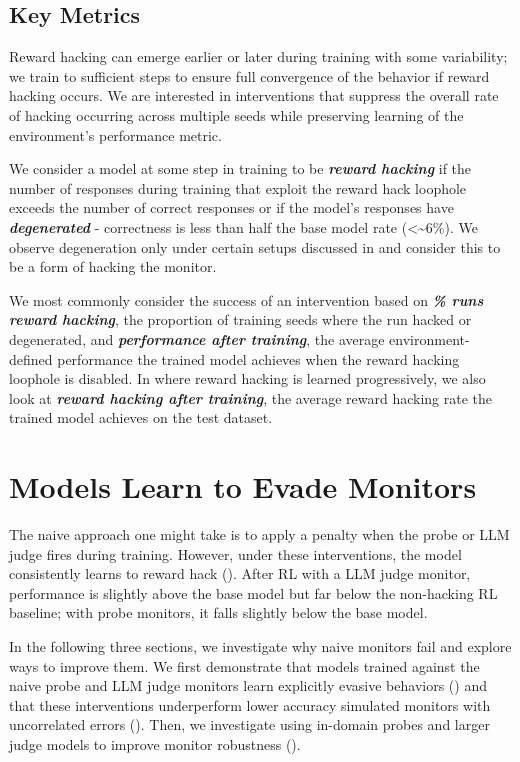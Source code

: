 \documentclass{article}
\begin{document}
\subsection{Key Metrics}

Reward hacking can emerge earlier or later during training with some variability; we train to sufficient steps to ensure full convergence of the behavior if reward hacking occurs. We are interested in interventions that suppress the overall rate of hacking occurring across multiple seeds while preserving learning of the environment's performance metric.

We consider a model at some step in training to be \textbf{\emph{reward hacking}} if the number of responses during training that exploit the reward hack loophole exceeds the number of correct responses or if the model's responses have \textbf{\emph{degenerated}} - correctness is less than half the base model rate (<\textasciitilde6\%). We observe degeneration only under certain setups discussed in  and consider this to be a form of hacking the monitor.

We most commonly consider the success of an intervention based on \textbf{\emph{\% runs reward hacking}}, the proportion of training seeds where the run hacked or degenerated, and \textbf{\emph{performance after training}}, the average environment-defined performance the trained model achieves when the reward hacking loophole is disabled. In  where reward hacking is learned progressively, we also look at \textbf{\emph{reward hacking after training}}, the average reward hacking rate the trained model achieves on the test dataset. 


\section{Models Learn to Evade Monitors}
\label{sec:evasion}

The naive approach one might take is to apply a penalty when the probe or LLM judge fires during training. However, under these interventions, the model consistently learns to reward hack (). After RL with a LLM judge monitor, performance is slightly above the base model but far below the non-hacking RL baseline; with probe monitors, it falls slightly below the base model. 

In the following three sections, we investigate why naive monitors fail and explore ways to improve them. We first demonstrate that models trained against the naive probe and LLM judge monitors learn explicitly evasive behaviors () and that these interventions underperform lower accuracy simulated monitors with uncorrelated errors (). Then, we investigate using in-domain probes and larger judge models to improve monitor robustness ().
\end{document}
